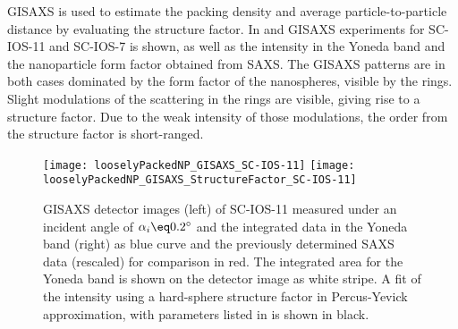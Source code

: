 \documentclass[\main/dresen_thesis.tex]{subfiles}
\begin{document}
  \label{sec:looselyPackedNS:layers:gisaxs}
  GISAXS is used to estimate the packing density and average particle-to-particle distance by evaluating the structure factor.
  In  and  GISAXS experiments for SC-IOS-11 and SC-IOS-7 is shown, as well as the intensity in the Yoneda band and the nanoparticle form factor obtained from SAXS.
  The GISAXS patterns are in both cases dominated by the form factor of the nanospheres, visible by the rings.
  Slight modulations of the scattering in the rings are visible, giving rise to a structure factor.
  Due to the weak intensity of those modulations, the order from the structure factor is short-ranged.
  \begin{figure}[tb]
    \centering
    \texttt{[image: looselyPackedNP\_GISAXS\_SC-IOS-11]}
    \texttt{[image: looselyPackedNP\_GISAXS\_StructureFactor\_SC-IOS-11]}
    \caption{\label{fig:looselyPackedNP:layer:gisaxsSC_IOS_11}GISAXS detector images (left) of SC-IOS-11 measured under an incident angle of $\alpha_i \eq 0.2 ^\circ$ and the integrated data in the Yoneda band (right) as blue curve and the previously determined SAXS data (rescaled) for comparison in red. The integrated area for the Yoneda band is shown on the detector image as white stripe. A fit of the intensity using a hard-sphere structure factor in Percus-Yevick approximation, with parameters listed in  is shown in black.}
  \end{figure}
\end{document}
